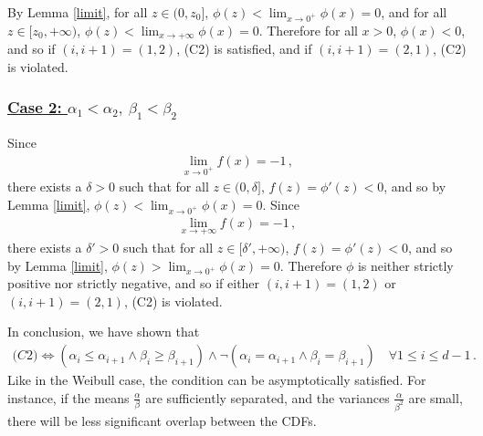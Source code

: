 \documentclass{article}
\newcommand{\metroall}[3]{
	\begin{table}
		\centering
		\renewcommand{\arraystretch}{1.2}
		
		\caption{Metropolis algorithm for
			$\pi_{\theta}^{\text{QD}}$ for #3}
		\label{table:#1-1}
	\end{table}
	
	\begin{table}
		\centering
		\renewcommand{\arraystretch}{1.2}
		
		\caption{Metropolis algorithm for
			$\pi^{\text{QD}}_{\theta \mid \mathbf{x}^{\text{#2}}}$ for #3}
	\end{table}
	
	\begin{table}
		\centering
		\renewcommand{\arraystretch}{1.2}
		
		\caption{Metropolis algorithm for
			$\pi_{\theta}^{\text{ME}}$ for #3}
	\end{table}
	
	\begin{table}
		\centering
		\renewcommand{\arraystretch}{1.2}
		
		\caption{Metropolis algorithm for
			$\pi^{\text{ME}}_{\theta \mid \mathbf{x}^{\text{#2}}}$ for #3}
	\end{table}
	
	\begin{table}
		\centering
		\renewcommand{\arraystretch}{1.2}
		
		\caption{Metropolis algorithm for
			$\pi^{\text{ULS}}_{\theta \mid \mathbf{x}^{\text{#2}}}$ for #3}
		\label{table:#1-2}
	\end{table}

	\begin{table}
		\centering
		\renewcommand{\arraystretch}{1.2}
		
		\caption{Metropolis algorithm for
			$\pi_{\theta}^{\text{SAS}}$ for #3}
		\label{table:#1-1}
	\end{table}
	
	\begin{table}
		\centering
		\renewcommand{\arraystretch}{1.2}
		
		\caption{Metropolis algorithm for
			$\pi^{\text{SAS}}_{\theta \mid \mathbf{x}^{\text{#2}}}$ for #3}
	\end{table}
}
\begin{document}
%
By Lemma \ref{limit}, for all $z \in (0, z_0]$,
$\phi(z) < \lim_{x\to 0^+}\phi(x)=0$, and for all $z \in[z_0, +\infty)$,
$\phi(z) < \lim_{x \to +\infty} \phi(x) = 0$.
Therefore for all $x > 0$, $\phi(x) < 0$, and so if $(i, i + 1)=(1, 2)$,
(C2) is satisfied, and if $(i, i + 1) = (2, 1)$, (C2) is violated.
%
\subsubsection*{\underline{Case 2: $\alpha_1<\alpha_2,\  \beta_1<\beta_2$}}
%

%
Since
%
\begin{align*}
	\lim_{x \to 0^+} f(x) = -1 \,,
\end{align*}
%
there exists a $\delta > 0$ such that for all $z \in (0, \delta]$,
$f(z) = \phi'(z) < 0$, and so by Lemma \ref{limit},
$\phi(z) < \lim_{x \to 0^+} \phi(x) = 0$. Since
%
\begin{align*}
	\lim_{x \to +\infty} f(x) = -1 \,,
\end{align*}
%
there exists a $\delta' > 0$ such that for all $z \in [\delta', +\infty)$,
$f(z) = \phi'(z) < 0$, and so by Lemma \ref{limit},
$\phi(z) > \lim_{x \to 0^+} \phi(x) = 0$.
Therefore $\phi$ is neither strictly positive nor strictly negative,
and so if either $(i, i + 1) = (1, 2)$ or
$(i, i + 1) = (2, 1)$, (C2) is violated.
%

%
In conclusion, we have shown that
%
\begin{align*}
	\textit{(C2)} \iff (\alpha_i \leq \alpha_{i + 1} \land \beta_{i}
	\geq \beta_{i + 1}) \land \neg(\alpha_i = \alpha_{i+1} \land \beta_i
	= \beta_{i + 1}) \quad \forall 1 \leq i\leq d - 1 \,.
\end{align*}
%
Like in the Weibull case, the condition can be asymptotically satisfied.
For instance, if the means $\frac{\alpha}{\beta}$ are sufficiently separated,
and the variances $\frac{\alpha}{\beta ^ 2}$ are small,
there will be less significant overlap between the CDFs.
%
\metroall{pd}{PD}{pseudo-data simulation study}
\metroall{ppp}{PPP}{Poisson process simulation study}
%


%
\end{document}
